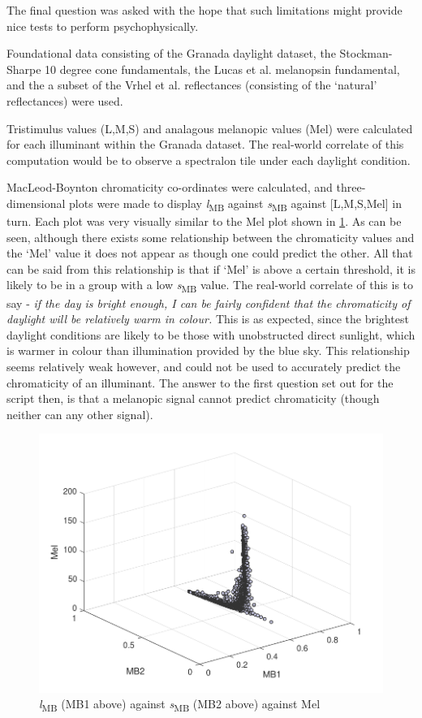 \documentclass{article}
\begin{document}
The final question was asked with the hope that such limitations might provide nice tests to perform psychophysically. 

Foundational data consisting of the Granada daylight dataset, the Stockman-Sharpe 10 degree cone fundamentals, the Lucas et al. melanopsin fundamental, and the a subset of the Vrhel et al. reflectances (consisting of the `natural' reflectances) were used.

Tristimulus values (L,M,S) and analagous melanopic values (Mel) were calculated for each illuminant within the Granada dataset. The real-world correlate of this computation would be to observe a spectralon tile under each daylight condition.

MacLeod-Boynton chromaticity co-ordinates were calculated, and three-dimensional plots were made to display \textit{l}\textsubscript{MB} against \textit{s}\textsubscript{MB} against [L,M,S,Mel] in turn. Each plot was very visually similar to the Mel plot shown in \ref{fig:l1}. As can be seen, although there exists some relationship between the chromaticity values and the `Mel' value it does not appear as though one could predict the other. All that can be said from this relationship is that if `Mel' is above a certain threshold, it is likely to be in a group with a low \textit{s}\textsubscript{MB} value. The real-world correlate of this is to say - \textit{if the day is bright enough, I can be fairly confident that the chromaticity of daylight will be relatively warm in colour.} This is as expected, since the brightest daylight conditions are likely to be those with unobstructed direct sunlight, which is warmer in colour than illumination provided by the blue sky. This relationship seems relatively weak however, and could not be used to accurately predict the chromaticity of an illuminant. The answer to the first question set out for the script then, is that a melanopic signal cannot predict chromaticity (though neither can any other signal).

\begin{figure}[ht]
    \centering
    \includegraphics[width=\textwidth]{figs/Level1sigs.pdf}
    \caption{\textit{l}\textsubscript{MB} (MB1 above) against \textit{s}\textsubscript{MB} (MB2 above) against Mel}
    \label{fig:l1}
\end{figure} 
\end{document}
